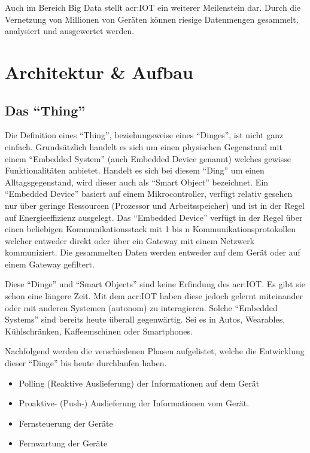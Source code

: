 Auch im Bereich Big Data stellt \gls{acr:IOT} ein weiterer Meilenstein dar. Durch die Vernetzung von Millionen von Geräten können riesige Datenmengen gesammelt, analysiert und ausgewertet werden.


\section{Architektur \& Aufbau}


\subsection{Das "`Thing"'}
Die Definition eines "`Thing"', beziehungsweise eines "`Dinges"', ist nicht ganz einfach. Grundsätzlich handelt es sich um einen physischen Gegenstand mit einem "`Embedded System"' (auch Embedded Device genannt) welches gewisse Funktionalitäten anbietet. Handelt es sich bei diesem "`Ding"' um einen Alltagsgegenstand, wird dieser auch als "`Smart Object"' bezeichnet. Ein "`Embedded Device"' basiert auf einem Mikrocontroller, verfügt relativ gesehen nur über geringe Ressourcen (Prozessor und Arbeitsspeicher) und ist in der Regel auf Energieeffizienz ausgelegt. Das "`Embedded Device"' verfügt in der Regel über einen beliebigen Kommunikationsstack mit 1 bis n Kommunikationsprotokollen welcher entweder direkt oder über ein Gateway mit einem Netzwerk kommuniziert. Die gesammelten Daten werden entweder auf dem Gerät oder auf einem Gateway gefiltert. 

Diese "`Dinge"' und "`Smart Objects"' sind keine Erfindung des \gls{acr:IOT}. Es gibt sie schon eine längere Zeit. Mit dem \gls{acr:IOT} haben diese jedoch gelernt miteinander oder mit anderen Systemen (autonom) zu interagieren. Solche "`Embedded Systems"' sind bereits heute überall gegenwärtig. Sei es in Autos, Wearables, Kühlschränken, Kaffeemschinen oder Smartphones.

Nachfolgend werden die verschiedenen Phasen aufgelistet, welche die Entwicklung dieser "`Dinge"' bis heute durchlaufen haben.

\begin{itemize} 
\item Polling (Reaktive Auslieferung) der Informationen auf dem Gerät
\item Proaktive- (Push-) Auslieferung der Informationen vom Gerät.
\item Fernsteuerung der Geräte
\item Fernwartung der Geräte
\end{itemize}

